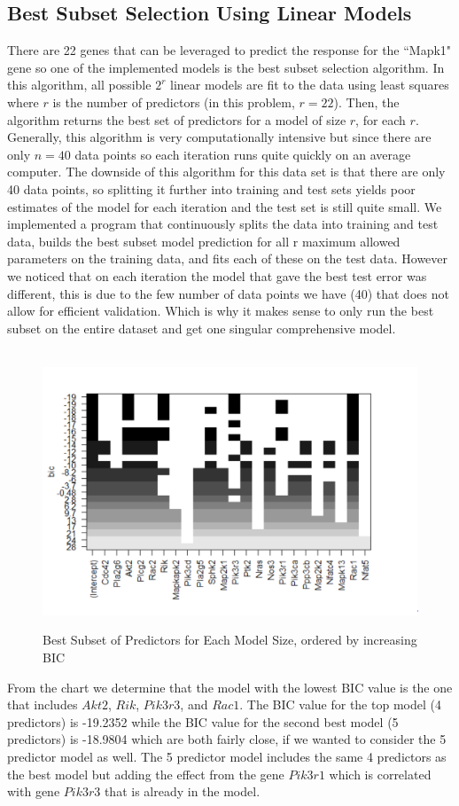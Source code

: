 \documentclass{article}
\begin{document}
\subsection{Best Subset Selection Using Linear Models}
There are 22 genes that can be leveraged to predict the response for the ``Mapk1" gene so one of the implemented models is the best subset selection algorithm.  In this algorithm, all possible $2^r$ linear models are fit to the data using least squares where $r$ is the number of predictors (in this problem, $r=22$).  Then, the algorithm returns the best set of predictors for a model of size $r$, for each $r$.  Generally, this algorithm is very computationally intensive but since there are only $n=40$ data points so each iteration runs quite quickly on an average computer.  The downside of this algorithm for this data set is that there are only 40 data points, so splitting it further into training and test sets yields poor estimates of the model for each iteration and the test set is still quite small. We implemented a program that continuously splits the data into training and test data, builds the best subset model prediction for all r maximum allowed parameters on the training data, and fits each of these on the test data. However we noticed that on each iteration the model that gave the best test error was different, this is due to the few number of data points we have (40) that does not allow for efficient validation. Which is why it makes sense to only run the best subset on the entire dataset and get one singular comprehensive model.\\
\null\\
\begin{figure}[H]
	\caption{Best Subset of Predictors for Each Model Size, ordered by increasing BIC}
	\includegraphics[scale=0.60]{best_subsets}
	\centering
	\label{fig:best_subsets}
\end{figure}
From the chart we determine that the model with the lowest BIC value is the one that includes $Akt2$, $Rik$, $Pik3r3$, and $Rac1$.  The BIC value for the top model (4 predictors) is  -19.2352 while the BIC value for the second best model (5 predictors) is -18.9804 which are both fairly close, if we wanted to consider the 5 predictor model as well.  The 5 predictor model includes the same 4 predictors as the best model but adding the effect from the gene $Pik3r1$ which is correlated with gene $Pik3r3$ that is already in the model.
%
\end{document}
